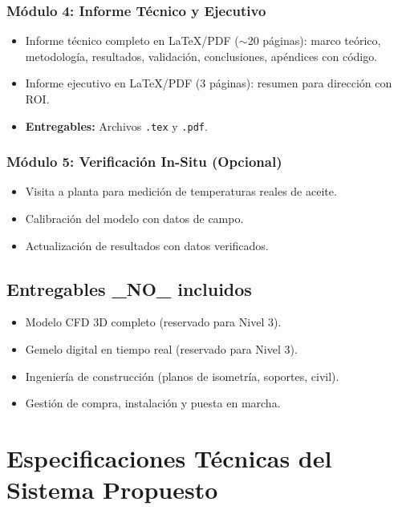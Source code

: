 \documentclass[11pt,a4paper]{article}
\begin{document}
\subsubsection{Módulo 4: Informe Técnico y Ejecutivo}

\begin{itemize}
  \item Informe técnico completo en LaTeX/PDF ($\sim$20 páginas): marco teórico, metodología, resultados, validación, conclusiones, apéndices con código.
  \item Informe ejecutivo en LaTeX/PDF (3 páginas): resumen para dirección con ROI.
  \item \textbf{Entregables:} Archivos \texttt{.tex} y \texttt{.pdf}.
\end{itemize}

\subsubsection{Módulo 5: Verificación In-Situ (Opcional)}

\begin{itemize}
  \item Visita a planta para medición de temperaturas reales de aceite.
  \item Calibración del modelo con datos de campo.
  \item Actualización de resultados con datos verificados.
\end{itemize}

\subsection{Entregables \_NO\_ incluidos}

\begin{itemize}
  \item Modelo CFD 3D completo (reservado para Nivel 3).
  \item Gemelo digital en tiempo real (reservado para Nivel 3).
  \item Ingeniería de construcción (planos de isometría, soportes, civil).
  \item Gestión de compra, instalación y puesta en marcha.
\end{itemize}

\newpage

\section{Especificaciones Técnicas del Sistema Propuesto}
\end{document}
